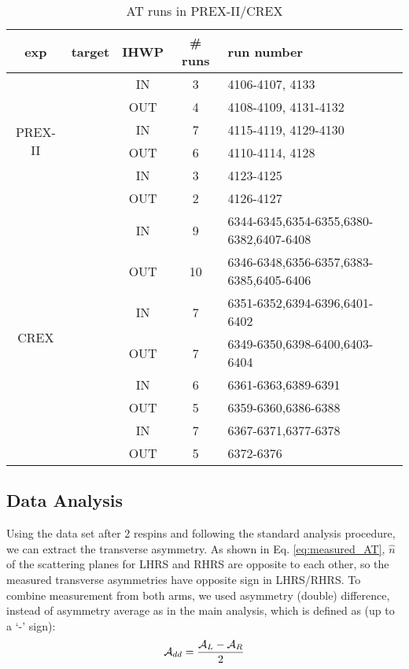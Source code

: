 \begin{table}[!h]
    \centering
    \begin{tabular}{c | c | c | c | l}
	\hline
	exp & target	& IHWP	& \# runs    & run number    \\
	\hline
	\multirow{6}{*}{PREX-II}    & \multirow{2}{*}{\C}   & IN    & 3	& 4106-4107, 4133    \\
	    &   & OUT   & 4 & 4108-4109, 4131-4132   \\
	    \cline{2-5}
	    & \multirow{2}{*}{\Pb}  & IN    & 7	& 4115-4119, 4129-4130  \\
	    &	& OUT	& 6 & 4110-4114, 4128   \\
	    \cline{2-5}
	    & \multirow{2}{*}{\ca}  & IN    & 3	& 4123-4125	\\
	    &	& OUT	& 2 & 4126-4127 \\
	\hline
	\multirow{8}{*}{CREX}	& \multirow{2}{*}{\Ca}	& IN	& 9 & 6344-6345,6354-6355,6380-6382,6407-6408\\
	    &	& OUT	& 10	& 6346-6348,6356-6357,6383-6385,6405-6406   \\
	    \cline{2-5}
	    & \multirow{2}{*}{\ca}	& IN	& 7 & 6351-6352,6394-6396,6401-6402	\\
	    &	& OUT	& 7 & 6349-6350,6398-6400,6403-6404	\\
	    \cline{2-5}
	    & \multirow{2}{*}{\C}	& IN	& 6 & 6361-6363,6389-6391	\\
	    &	& OUT	& 5 & 6359-6360,6386-6388	\\
	    \cline{2-5}
	    & \multirow{2}{*}{\Pb}	& IN	& 7 & 6367-6371,6377-6378	\\
	    &	& OUT	& 5 & 6372-6376 \\
	\hline
    \end{tabular}
    \caption{AT runs in PREX-II/CREX}
\end{table}

\subsection{Data Analysis}

Using the data set after 2 respins and following the standard analysis procedure, 
we can extract the transverse asymmetry. As shown in Eq. \ref{eq:measured_AT},
$\hat{n}$ of the scattering planes for LHRS and RHRS are opposite to each other,
so the measured transverse asymmetries have opposite sign in LHRS/RHRS. To
combine measurement from both arms, we used asymmetry (double) difference, instead of 
asymmetry average as in the main analysis, which is defined as (up to a `-' sign):
\begin{equation}
    \mathcal{A}_{dd} = \frac{\mathcal{A}_L - \mathcal{A}_R}{2}
\end{equation}

